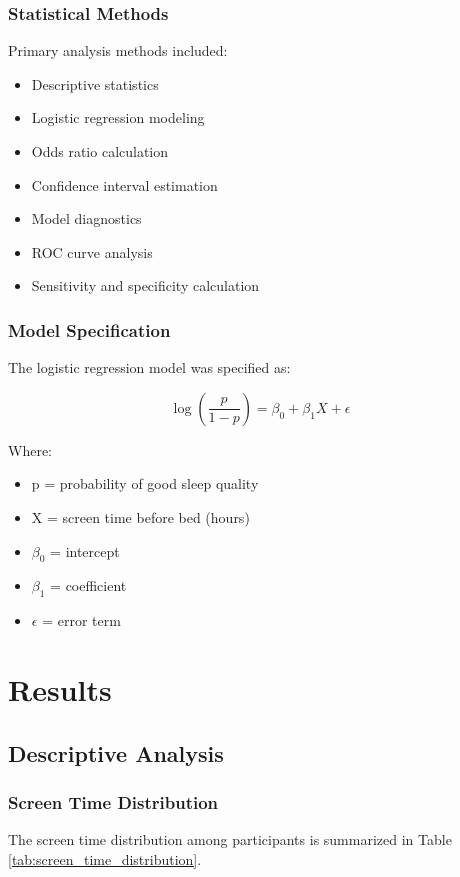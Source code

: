 \documentclass[conference]{IEEEtran}
\begin{document}
\subsubsection{Statistical Methods}
Primary analysis methods included:
\begin{itemize}
\item Descriptive statistics
\item Logistic regression modeling
\item Odds ratio calculation
\item Confidence interval estimation
\item Model diagnostics
\item ROC curve analysis
\item Sensitivity and specificity calculation
\end{itemize}

\subsubsection{Model Specification}
The logistic regression model was specified as:

\begin{equation}
\log\left(\frac{p}{1-p}\right) = \beta_0 + \beta_1X + \epsilon
\end{equation}

Where:
\begin{itemize}
\item p = probability of good sleep quality
\item X = screen time before bed (hours)
\item $\beta_0$ = intercept
\item $\beta_1$ = coefficient
\item \(\epsilon\) = error term
\end{itemize}

\section{Results}
\subsection{Descriptive Analysis}
\subsubsection{Screen Time Distribution}
The screen time distribution among participants is summarized in Table \ref{tab:screen_time_distribution}.
\end{document}
